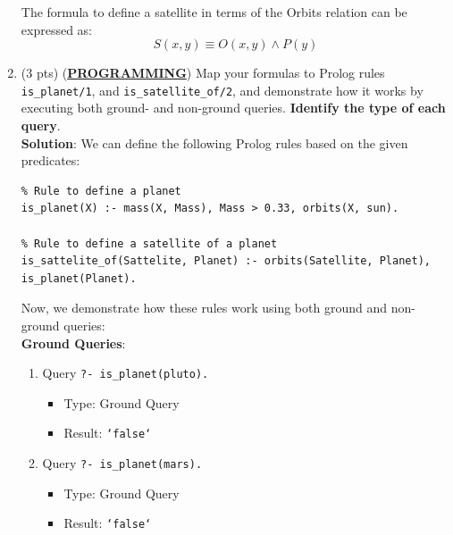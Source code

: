 \documentclass[12pt]{article}
\begin{document}
\begin{spacing}{1.5}
\begin{enumerate}
\begin{itemize}
		      \end{itemize}
		      		      		      		      		      		      		      		      
		      The formula to define a satellite in terms of the Orbits relation can be expressed as:
		      $$S(x,y) \equiv O(x,y) \land P(y)$$
		              
		\item 
		      (3 pts) (\uline{\textbf{PROGRAMMING}}) Map your formulas to Prolog rules \texttt{is\_planet/1}, and
		      \texttt{is\_satellite\_of/2}, and demonstrate how it works by executing both ground- and
		      non-ground queries. \textbf{Identify the type of each query}.\\
		      		      		      		      		      		      		      
		      \textbf{Solution}: We can define the following Prolog rules based on the given predicates:
		      		      		      		      		      		      		      
		      \begin{verbatim}
% Rule to define a planet
is_planet(X) :- mass(X, Mass), Mass > 0.33, orbits(X, sun).

% Rule to define a satellite of a planet
is_sattelite_of(Sattelite, Planet) :- orbits(Satellite, Planet), is_planet(Planet).
		      \end{verbatim}
		      		      		      		      		      		      		      
		      Now, we demonstrate how these rules work using both ground and non-ground queries:\\
		      		      		      		      		      		      		      
		      \textbf{Ground Queries}:
		      		      		      		      		      		      		      
		      \begin{enumerate}
		      	\item 
		      	      Query \texttt{?- is\_planet(pluto).}
		      	      \begin{itemize}
		      	      	\item Type: Ground Query
		      	      	\item Result: \texttt{`false`}
		      	      \end{itemize}
		      	      		      	      		      	      		      	      		      	      		      	      		      	      
		      	\item 
		      	      Query \texttt{?- is\_planet(mars).}
		      	      \begin{itemize}
		      	      	\item Type: Ground Query
		      	      	\item Result: \texttt{`false`}
		      	      \end{itemize}
		      	      		      	      		      	      		      	      		      	      		      	      		      	      

\end{enumerate}
\end{enumerate}
\end{spacing}
\end{document}
